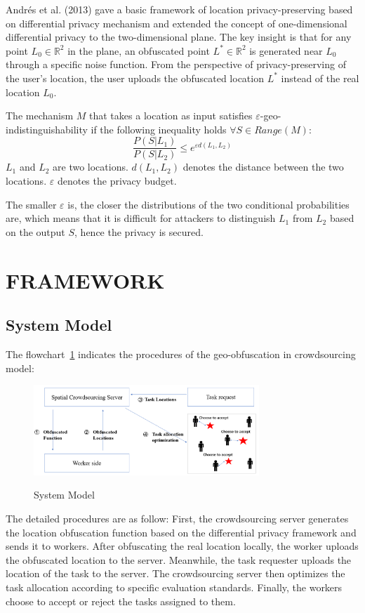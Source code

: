 Andrés et al. (2013) gave a basic framework of location privacy-preserving based on differential privacy mechanism and extended the concept of one-dimensional differential privacy to the two-dimensional plane. The key insight is that for any point $L_0 \in \mathbb R^2$ in the plane, an obfuscated point $L^* \in \mathbb R^2$ is generated near $L_0$ through a specific noise function. From the perspective of privacy-preserving of the user's location, the user uploads the obfuscated location $L^*$ instead of the real location $L_0$.

\begin{definition}
	The mechanism $M$ that takes a location as input satisfies $\varepsilon$-geo-indistinguishability if the following inequality holds $\forall S \in Range(M)$: 
	$$
	\frac{P(S|L_1)}{P(S|L_2)} \leq e^{\varepsilon d(L_1,L_2)}
	$$
	$L_1$ and $L_2$ are two locations. $d(L_1,L_2)$ denotes the distance between the two locations. $\varepsilon$ denotes the privacy budget. 
\end{definition}
 The smaller $\varepsilon$ is, the closer the distributions of the two conditional probabilities are, which means that it is difficult for attackers to distinguish $L_1$ from $L_2$ based on the output $S$, hence the privacy is secured.

\section{FRAMEWORK} %
\subsection{System Model} %
\label{Sec3.1}
The flowchart~\ref{img:SysModel} indicates the procedures of the geo-obfuscation in crowdsourcing model:

\begin{figure}
\includegraphics[width=8.5cm]{SysModel}
\label{img:SysModel}
\caption{System Model}
\end{figure}

The detailed procedures are as follow:
First, the crowdsourcing server generates the location obfuscation function based on the differential privacy framework and sends it to workers. After obfuscating the real location locally, the worker uploads the obfuscated location to the server. Meanwhile, the task requester uploads the location of the task to the server. The crowdsourcing server then optimizes the task allocation according to specific evaluation standards. Finally, the workers choose to accept or reject the tasks assigned to them.

